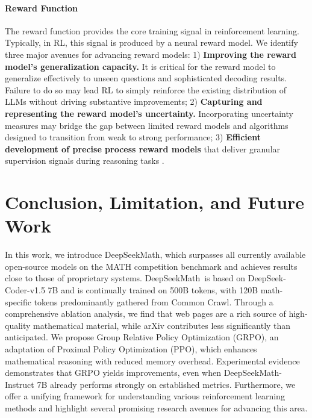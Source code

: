 \begin{itemize}[topsep=0pt]
\begin{itemize}[topsep=0pt]
\paragraph{Reward Function} The reward function provides the core training signal in reinforcement learning. Typically, in RL, this signal is produced by a neural reward model. We identify three major avenues for advancing reward models: 1) \textbf{Improving the reward model's generalization capacity.} It is critical for the reward model to generalize effectively to unseen questions and sophisticated decoding results. Failure to do so may lead RL to simply reinforce the existing distribution of LLMs without driving substantive improvements; 2) \textbf{Capturing and representing the reward model's uncertainty.} Incorporating uncertainty measures may bridge the gap between limited reward models and algorithms designed to transition from weak to strong performance; 3) \textbf{Efficient development of precise process reward models} that deliver granular supervision signals during reasoning tasks \citep{lightman2023let,wang2023math}.

\section{Conclusion, Limitation, and Future Work} In this work, we introduce DeepSeekMath, which surpasses all currently available open-source models on the MATH competition benchmark and achieves results close to those of proprietary systems. DeepSeekMath~is based on DeepSeek-Coder-v1.5 7B and is continually trained on 500B tokens, with 120B math-specific tokens predominantly gathered from Common Crawl. Through a comprehensive ablation analysis, we find that web pages are a rich source of high-quality mathematical material, while arXiv contributes less significantly than anticipated. We propose Group Relative Policy Optimization (GRPO), an adaptation of Proximal Policy Optimization (PPO), which enhances mathematical reasoning with reduced memory overhead. Experimental evidence demonstrates that GRPO yields improvements, even when DeepSeekMath-Instruct 7B already performs strongly on established metrics. Furthermore, we offer a unifying framework for understanding various reinforcement learning methods and highlight several promising research avenues for advancing this area.


\end{itemize}
\end{itemize}

